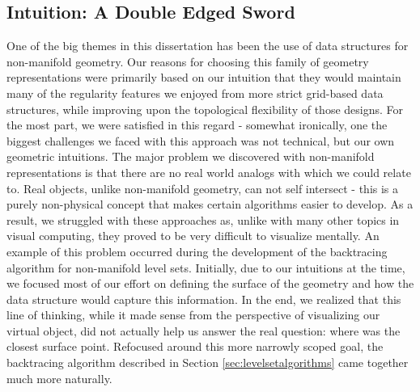 \subsection{Intuition: A Double Edged Sword}

One of the big themes in this dissertation has been the use of data
structures for non-manifold geometry. Our reasons for choosing this
family of geometry representations were primarily based on our
intuition that they would maintain many of the regularity features we
enjoyed from more strict grid-based data structures, while improving
upon the topological flexibility of those designs. For the most part,
we were satisfied in this regard - somewhat ironically, one the
biggest challenges we faced with this approach was not technical, but
our own geometric intuitions. The major problem we discovered with
non-manifold representations is that there are no real world analogs
with which we could relate to. Real objects, unlike non-manifold
geometry, can not self intersect - this is a purely non-physical
concept that makes certain algorithms easier to develop. As a result,
we struggled with these approaches as, unlike with many other topics
in visual computing, they proved to be very difficult to visualize
mentally. An example of this problem occurred during the development of
the backtracing algorithm for non-manifold level sets. Initially, due
to our intuitions at the time, we focused most of our effort on
defining the surface of the geometry and how the data structure would
capture this information. In the end, we realized that this line of
thinking, while it made sense from the perspective of visualizing our
virtual object, did not actually help us answer the real question:
where was the closest surface point. Refocused around this more
narrowly scoped goal, the backtracing algorithm described in Section
\ref{sec:levelsetalgorithms} came together much more naturally.

